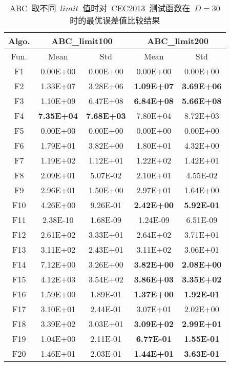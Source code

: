 \begin{table*}[!ht]
  \centering
  \caption{~ABC~取不同~$limit$~值时对~CEC2013~测试函数在~$D=30$~ 时的最优误差值比较结果}
  \scriptsize
    \begin{tabular}{|c|cc|cc|}
    \hline
    Algo. & \multicolumn{2}{c|}{ABC\_limit100} & \multicolumn{2}{c|}{ABC\_limit200} \\
    \hline
    Fun.  & Mean  & Std   & Mean  & Std \\
    \hline
   F1    & 0.00E+00 & 0.00E+00 & 0.00E+00 & 0.00E+00 \\
    F2    & 1.33E+07 & 3.28E+06 & \textbf{1.09E+07} & \textbf{3.69E+06} \\
    F3    & 1.10E+09 & 6.47E+08 & \textbf{6.84E+08} & \textbf{5.66E+08} \\
    F4    & \textbf{7.35E+04} & \textbf{7.68E+03} & 7.80E+04 & 8.72E+03 \\
    F5    & 0.00E+00 & 0.00E+00 & 0.00E+00 & 0.00E+00 \\
    \hline
    F6    & 1.79E+01 & 3.82E+00 & 1.80E+01 & 4.32E+00 \\
    F7    & 1.19E+02 & 1.12E+01 & 1.22E+02 & 1.42E+01 \\
    F8    & 2.09E+01 & 5.07E-02 & 2.10E+01 & 4.55E-02 \\
    F9    & 2.96E+01 & 1.50E+00 & 2.97E+01 & 1.64E+00 \\
    F10   & 4.26E+00 & 9.26E-01 & \textbf{2.42E+00} & \textbf{5.92E-01} \\
    F11   & 2.38E-10 & 1.68E-09 & 1.24E-09 & 6.51E-09 \\
    F12   & 2.61E+02 & 3.33E+01 & 2.64E+02 & 3.71E+01 \\
    F13   & 3.11E+02 & 2.43E+01 & 3.11E+02 & 3.06E+01 \\
    F14   & 7.12E+00 & 3.26E+00 & \textbf{3.82E+00} & \textbf{2.08E+00} \\
    F15   & 4.12E+03 & 3.54E+02 & \textbf{3.86E+03} & \textbf{3.35E+02} \\
    F16   & 1.59E+00 & 1.89E-01 & \textbf{1.37E+00} & \textbf{1.92E-01} \\
    F17   & 3.10E+01 & 2.44E-01 & 3.07E+01 & 2.02E+00 \\
    F18   & 3.39E+02 & 3.03E+01 & \textbf{3.09E+02} & \textbf{2.99E+01} \\
    F19   & 1.04E+00 & 2.11E-01 & \textbf{6.77E-01} & \textbf{1.55E-01} \\
    F20   & 1.46E+01 & 2.03E-01 & \textbf{1.44E+01} & \textbf{3.63E-01} \\

\end{tabular}
\end{table*}
